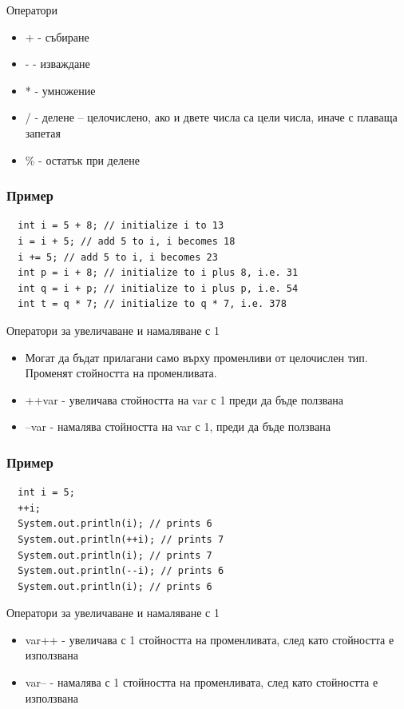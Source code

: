 \documentclass{beamer}
\begin{document}
\begin{frame}{Оператори}
  \transdissolve
  \begin{itemize}
  \item + - събиране
  \item - - изваждане
  \item * - умножение
  \item / - делене – целочислено, ако и двете
    числа са цели числа, иначе с плаваща
    запетая
  \item \% - остатък при делене
  \end{itemize}
\end{frame}

\begin{frame}[fragile]
  \frametitle{Пример}
  \transdissolve
\begin{lstlisting}
  int i = 5 + 8; // initialize i to 13
  i = i + 5; // add 5 to i, i becomes 18
  i += 5; // add 5 to i, i becomes 23
  int p = i + 8; // initialize to i plus 8, i.e. 31
  int q = i + p; // initialize to i plus p, i.e. 54
  int t = q * 7; // initialize to q * 7, i.e. 378
\end{lstlisting}
\end{frame}

\begin{frame}{Оператори за увеличаване и намаляване с 1}
  \transdissolve
  \begin{itemize}
  \item Могат да бъдат прилагани само върху
    променливи от целочислен тип.
    Променят стойността на променливата.

   \item ++var - увеличава стойността на var с 1
    преди да бъде ползвана

   \item --var - намалява стойността на var с 1,
    преди да бъде ползвана
  \end{itemize}
\end{frame}

\begin{frame}[fragile]
  \frametitle{Пример}
  \transdissolve
\begin{lstlisting}
  int i = 5;
  ++i;
  System.out.println(i); // prints 6
  System.out.println(++i); // prints 7
  System.out.println(i); // prints 7
  System.out.println(--i); // prints 6
  System.out.println(i); // prints 6
\end{lstlisting}
\end{frame}

\begin{frame}{Оператори за увеличаване и намаляване с 1}
  \transdissolve
  \begin{itemize}
  \item var++ - увеличава с 1 стойността на
    променливата, след като стойността е
    използвана
  \item var-- - намалява с 1 стойността на
    променливата, след като стойността е
    използвана
  \end{itemize}
\end{frame}
\end{document}
